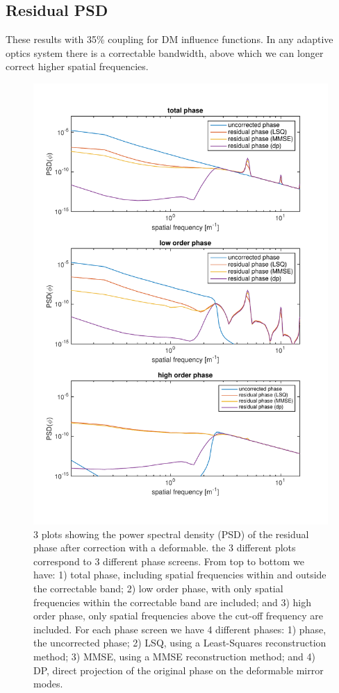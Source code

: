 \documentclass[pdf]{note}
\begin{document}
\subsection{Residual PSD}
These results with 35\% coupling for DM influence functions.
In any adaptive optics system there is a correctable bandwidth, above which we can longer
correct higher spatial frequencies.  
\begin{figure}[htdp]
    \centerline{
      \includegraphics[trim = 10 40 10 40, clip, scale=0.7]{plots/residual_PSDs_from_different_phasecubes}
    }
    \caption{3 plots showing the power spectral density (PSD) of the residual phase after correction
    		with a deformable.  the 3 different plots correspond to 3 different phase screens.  From
		top to bottom we have: 1) total phase, including spatial frequencies within and outside
		the correctable band; 2) low order phase, with only spatial frequencies within the
		correctable band are included; and 3) high order phase, only spatial frequencies above
		the cut-off frequency are included.  For each phase screen we have 4 different phases:
		1) phase, the uncorrected phase; 2) LSQ, using a Least-Squares reconstruction method;
		3) MMSE, using a MMSE reconstruction method; and 4) DP, direct projection of the original
		phase on the deformable mirror modes.
    }
    \label{fig:PSDs_res_phase}
\end{figure}
\end{document}
